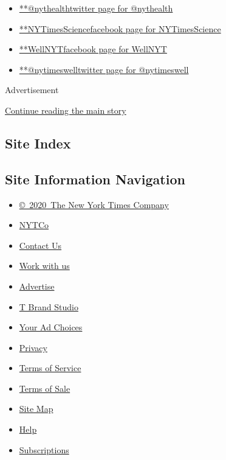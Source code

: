 \begin{itemize}
\tightlist
\item
  \href{https://twitter.com/nythealth}{**@nythealthtwitter page for
  @nythealth}
\item
  \href{https://www.facebookcorewwwi.onion/NYTimesScience}{**NYTimesSciencefacebook
  page for NYTimesScience}
\item
  \href{https://www.facebookcorewwwi.onion/WellNYT}{**WellNYTfacebook
  page for WellNYT}
\item
  \href{https://twitter.com/nytimeswell}{**@nytimeswelltwitter page for
  @nytimeswell}
\end{itemize}

Advertisement

\protect\hyperlink{after-mktg}{Continue reading the main story}

\hypertarget{site-index}{%
\subsection{Site Index}\label{site-index}}

\hypertarget{site-information-navigation}{%
\subsection{Site Information
Navigation}\label{site-information-navigation}}

\begin{itemize}
\tightlist
\item
  \href{https://help.nytimes3xbfgragh.onion/hc/en-us/articles/115014792127-Copyright-notice}{©~2020~The
  New York Times Company}
\end{itemize}

\begin{itemize}
\tightlist
\item
  \href{https://www.nytco.com/}{NYTCo}
\item
  \href{https://help.nytimes3xbfgragh.onion/hc/en-us/articles/115015385887-Contact-Us}{Contact
  Us}
\item
  \href{https://www.nytco.com/careers/}{Work with us}
\item
  \href{https://nytmediakit.com/}{Advertise}
\item
  \href{http://www.tbrandstudio.com/}{T Brand Studio}
\item
  \href{https://www.nytimes3xbfgragh.onion/privacy/cookie-policy\#how-do-i-manage-trackers}{Your
  Ad Choices}
\item
  \href{https://www.nytimes3xbfgragh.onion/privacy}{Privacy}
\item
  \href{https://help.nytimes3xbfgragh.onion/hc/en-us/articles/115014893428-Terms-of-service}{Terms
  of Service}
\item
  \href{https://help.nytimes3xbfgragh.onion/hc/en-us/articles/115014893968-Terms-of-sale}{Terms
  of Sale}
\item
  \href{https://spiderbites.nytimes3xbfgragh.onion}{Site Map}
\item
  \href{https://help.nytimes3xbfgragh.onion/hc/en-us}{Help}
\item
  \href{https://www.nytimes3xbfgragh.onion/subscription?campaignId=37WXW}{Subscriptions}
\end{itemize}
